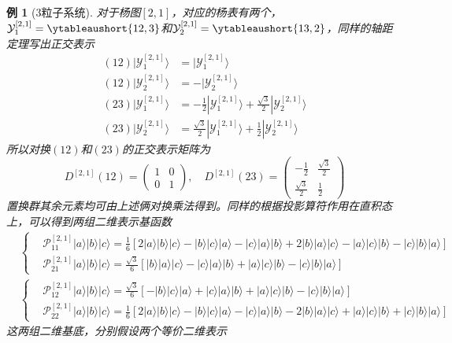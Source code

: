 \documentclass[12pt]{article}
\newtheorem{example}{例}[subsection]
\begin{document}
\begin{example}[3粒子系统]
    对于杨图$[2,1]$，对应的杨表有两个，$\mathcal{Y}_1^{[2,1]}=\ytableaushort{12,3}$和$\mathcal{Y}_2^{[2,1]}=\ytableaushort{13,2}$，同样的轴距定理写出正交表示
    \begin{equation*}
        \begin{split}
            (12)|\mathcal{Y}_1^{[2,1]}\rangle&=|\mathcal{Y}_1^{[2,1]}\rangle\\
            (12)|\mathcal{Y}_2^{[2,1]}\rangle&=-|\mathcal{Y}_2^{[2,1]}\rangle\\
            (23)|\mathcal{Y}_1^{[2,1]}\rangle&=-\frac{1}{2}|\mathcal{Y}_1^{[2,1]}\rangle+\frac{\sqrt{3}}{2}|\mathcal{Y}_2^{[2,1]}\rangle\\
            (23)|\mathcal{Y}_2^{[2,1]}\rangle&=\frac{\sqrt{3}}{2}|\mathcal{Y}_1^{[2,1]}\rangle+\frac{1}{2}|\mathcal{Y}_2^{[2,1]}\rangle
        \end{split}
    \end{equation*}
    所以对换$(12)$和$(23)$的正交表示矩阵为
    \begin{equation*}
        D^{[2,1]}(12)=\begin{pmatrix}
            1&0\\
            0&1
        \end{pmatrix},\quad D^{[2,1]}(23)=\begin{pmatrix}
            -\frac{1}{2}&\frac{\sqrt{3}}{2}\\
            \frac{\sqrt{3}}{2}&\frac{1}{2}
        \end{pmatrix}
    \end{equation*}
    置换群其余元素均可由上述俩对换乘法得到。同样的根据投影算符作用在直积态上，可以得到两组二维表示基函数
    \begin{equation*}
        \begin{split}
            &\begin{cases}
                &\mathcal{P}_{11}^{[2,1]}|a\rangle|b\rangle|c\rangle=\frac{1}{6}[2|a\rangle|b\rangle|c\rangle-|b\rangle|c\rangle|a\rangle-|c\rangle|a\rangle|b\rangle+2|b\rangle|a\rangle|c\rangle-|a\rangle|c\rangle|b\rangle-|c\rangle|b\rangle|a\rangle]\\
                &\mathcal{P}_{21}^{[2,1]}|a\rangle|b\rangle|c\rangle=\frac{\sqrt{3}}{6}[|b\rangle|a\rangle|c\rangle-|c\rangle|a\rangle|b\rangle+|a\rangle|c\rangle|b\rangle-|c\rangle|b\rangle|a\rangle]
            \end{cases}\\
            &\begin{cases}
                &\mathcal{P}_{12}^{[2,1]}|a\rangle|b\rangle|c\rangle=\frac{\sqrt{3}}{6}[-|b\rangle|c\rangle|a\rangle+|c\rangle|a\rangle|b\rangle+|a\rangle|c\rangle|b\rangle-|c\rangle|b\rangle|a\rangle]\\
                &\mathcal{P}_{22}^{[2,1]}|a\rangle|b\rangle|c\rangle=\frac{1}{6}[2|a\rangle|b\rangle|c\rangle-|b\rangle|c\rangle|a\rangle-|c\rangle|a\rangle|b\rangle-2|b\rangle|a\rangle|c\rangle+|a\rangle|c\rangle|b\rangle+|c\rangle|b\rangle|a\rangle]
            \end{cases}
        \end{split}
    \end{equation*}
    这两组二维基底，分别假设两个等价二维表示
\end{example}
\end{document}
